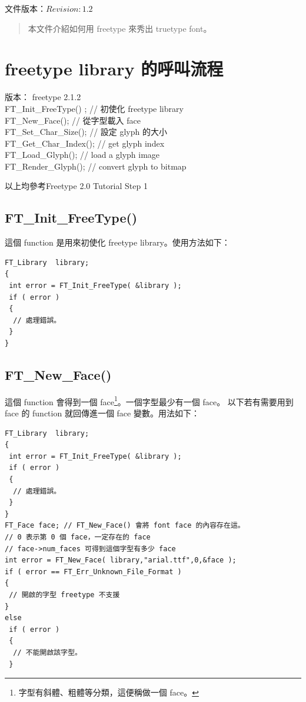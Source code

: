 \documentclass[12pt,a4]{article}
\begin{document}
\begin{CJK}{UTF8}{cwmu} %
\renewcommand{\abstractname}{摘要}
\renewcommand{\figurename}{圖}
\renewcommand{\contentsname}{目錄}

文件版本：$Revision: 1.2 $
\newpage
\tableofcontents
{}
\newpage


\begin{abstract}
本文件介紹如何用 freetype 來秀出 truetype font。
\end{abstract}
\newpage
\section{freetype library 的呼叫流程}
版本： freetype 2.1.2\\
FT\_{}Init\_{}FreeType() ; // 初使化 freetype library\\
FT\_{}New\_{}Face(); // 從字型載入 face\\
FT\_{}Set\_{}Char\_{}Size(); // 設定 glyph 的大小\\
FT\_{}Get\_{}Char\_{}Index(); // get glyph index\\
FT\_{}Load\_{}Glyph(); // load a glyph image\\
FT\_{}Render\_{}Glyph(); // convert glyph to bitmap

以上均參考\cite{ftdocs}Freetype 2.0 Tutorial Step 1
\subsection{FT\_{}Init\_{}FreeType()}
這個 function 是用來初使化 freetype library。使用方法如下：\\
\begin{Verbatim}[commandchars=@\[\]]
FT_Library  library;
{
 int error = FT_Init_FreeType( &library );
 if ( error )
 {
  // 處理錯誤。
 }
}
\end{Verbatim}
\subsection{FT\_{}New\_{}Face()}
這個 function 會得到一個 face\footnote{字型有斜體、粗體等分類，這便稱做一個 face。}。一個字型最少有一個 face。
以下若有需要用到 face 的 function 就回傳進一個 face 變數。用法如下：
\begin{Verbatim}[commandchars=@\[\]]
FT_Library  library;
{
 int error = FT_Init_FreeType( &library );
 if ( error )
 {
  // 處理錯誤。
 }
}
FT_Face face; // FT_New_Face() 會將 font face 的內容存在這。
// 0 表示第 0 個 face，一定存在的 face
// face->num_faces 可得到這個字型有多少 face
int error = FT_New_Face( library,"arial.ttf",0,&face );
if ( error == FT_Err_Unknown_File_Format )
{
 // 開啟的字型 freetype 不支援
}
else 
 if ( error )
 {
  // 不能開啟該字型。
 }
\end{Verbatim}

\end{CJK}
\end{document}
